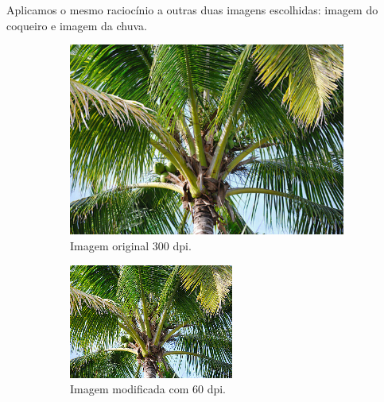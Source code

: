 \documentclass{article}
\begin{document}
Aplicamos o mesmo raciocínio a outras duas imagens escolhidas: imagem do coqueiro e imagem da chuva.

\begin{figure}[H]
    \centering
    \caption{Imagens do coqueiro.}
    \begin{subfigure}[b]{0.3\textwidth}
        \includegraphics[width=\textwidth]{imgs/2.1.png}
        \caption{Imagem original 300 dpi.}
    \end{subfigure}%
    \hfill
    \begin{subfigure}[b]{0.3\textwidth}
        \includegraphics[width=\textwidth]{imgs/2.2.png}
        \caption{Imagem modificada com 60 dpi.}
    \end{subfigure}%
    \hfill
    \begin{subfigure}[b]{0.3\textwidth}

\end{subfigure}
\end{figure}
\end{document}
